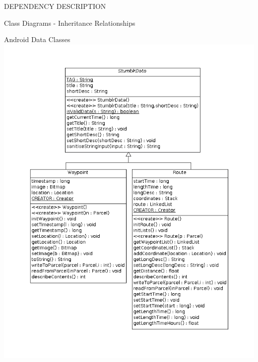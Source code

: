 \documentclass{article}
\begin{document}
\begin{section}{DEPENDENCY DESCRIPTION}
\begin{subsection}{Class Diagrams - Inheritance Relationships}
		\begin{subsubsection}{Android Data Classes}
			\includegraphics[angle=270,width=\columnwidth]{../ClassDiagrams/DataClasses.png}
		\end{subsubsection}
	\end{subsection}
\end{section}
\end{document}
